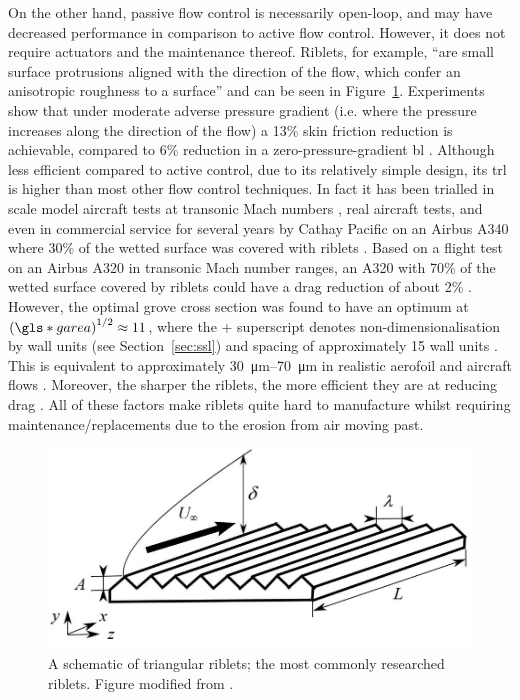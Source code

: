 On the other hand, passive flow control is necessarily open-loop, and may have decreased performance in comparison to active flow control. However, it does not require actuators and the maintenance thereof. Riblets, for example, ``are small surface protrusions aligned with the direction of the flow, which confer an anisotropic roughness to a surface'' \cite{garcia-mayoral2011} and can be seen in Figure~\ref{fig:riblets}. Experiments show that under moderate adverse pressure gradient (i.e. where the pressure increases along the direction of the flow) a 13\% skin friction reduction is achievable, compared to 6\% reduction in a zero-pressure-gradient \gls*{bl} \cite{debisschop1996}. Although less efficient compared to active control, due to its relatively simple design, its \gls*{trl} is higher than most other flow control techniques. In fact it has been trialled in scale model aircraft tests at transonic Mach numbers \cite{coustols1990}, real aircraft tests, and even in commercial service for several years by Cathay Pacific on an Airbus A340 where 30\% of the wetted surface was covered with riblets \cite{bechert2006}. Based on a flight test on an Airbus A320 in transonic Mach number ranges, an A320 with 70\% of the wetted surface covered by riblets could have a drag reduction of about 2\% \cite{szodruch1991}. However, the optimal grove cross section was found to have an optimum at $\left(\gls*{garea}\right)^{1 /2}\approx11$, where the $+$ superscript denotes non-dimensionalisation by wall units (see Section~\ref{sec:ssl}) and spacing of approximately 15 wall units \cite{garcia-mayoral2011}. This is equivalent to approximately \SIrange{30}{70}{\micro\metre} in realistic aerofoil and aircraft flows \cite{garcia-mayoral2011}. Moreover, the sharper the riblets, the more efficient they are at reducing drag \cite{garcia-mayoral2011}. All of these factors make riblets quite hard to manufacture whilst requiring maintenance/replacements due to the erosion from air moving past.

\begin{figure}[htbp]
\centering
\includegraphics[width=0.5\linewidth]{introduction/fig/riblets.jpeg}
\caption[Schematic of triangular riblets]{A schematic of triangular riblets; the most commonly researched riblets. Figure modified from \cite{raayai-ardakani2019}.}
\label{fig:riblets}
\end{figure}


